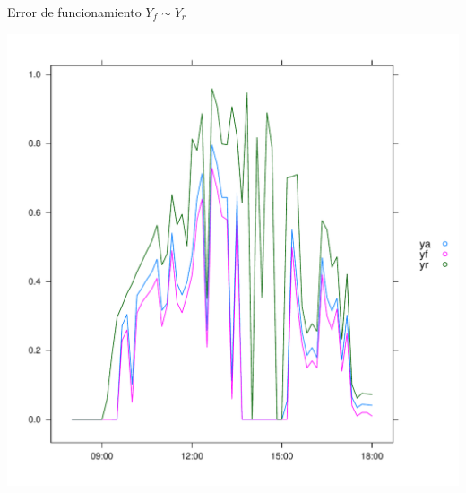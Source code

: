\documentclass[aspectratio=169, usenames,svgnames,dvipsnames]{beamer}
\begin{document}
\begin{frame}[label={sec:org90baebc}]{Error de funcionamiento \(Y_f \sim Y_r\)}
\begin{center}
\includegraphics[height=0.95\textheight]{../figs/ErrorYf.pdf}
\end{center}
\end{frame}
\end{document}
